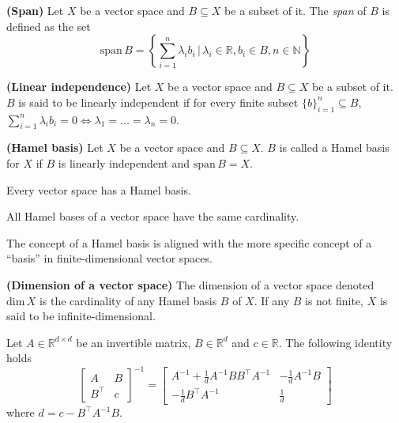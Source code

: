 \begin{definition}
	\textbf{(Span)}
	Let $X$ be a vector space and $B \subseteq X$ be a subset of it. The \textit{span} of $B$ is defined as the set
	\begin{equation}
		\text{span}\,B = \left\{ \sum_{i=1}^n \lambda_i b_i \, | \, \lambda_i \in \mathbb{R}, b_i \in B, n \in \mathbb{N} \right\} 
	\end{equation}
\end{definition}

\begin{definition}
	\textbf{(Linear independence)}
	Let $X$ be a vector space and $B \subseteq X$ be a subset of it. $B$ is said to be linearly independent if for every finite subset $\{b\}_{i=1}^n \subseteq B$, $\sum_{i=1}^n \lambda_i b_i = 0 \iff \lambda_1=\dots=\lambda_n = 0$.
\end{definition}

\begin{definition}
	\textbf{(Hamel basis)}
	Let $X$ be a vector space and $B \subseteq X$. $B$ is called a Hamel basis for $X$ if $B$ is linearly independent and $\text{span}\,B = X$.
\end{definition}

\begin{proposition}
	Every vector space has a Hamel basis.
\end{proposition}

\begin{proposition}
	All Hamel bases of a vector space have the same cardinality.
\end{proposition}

The concept of a Hamel basis is aligned with the more specific concept of a ``basis'' in finite-dimensional vector spaces. 

\begin{definition}
	\textbf{(Dimension of a vector space)}
	The dimension of a vector space denoted $\text{dim}\,X$ is the cardinality of any Hamel basis $B$ of $X$. If any $B$ is not finite, $X$ is said to be infinite-dimensional.
\end{definition}

\begin{proposition}
	Let $A \in \mathbb{R}^{d\times d}$ be an invertible matrix, $B \in \mathbb{R}^d$ and $c \in \mathbb{R}$. The following identity holds
	\begin{equation}
		\label{eq.matrix_inv_lemma}
		\begin{bmatrix}
			A & B \\
			B^\top & c
		\end{bmatrix}^{-1} 
		= 	\begin{bmatrix}
			A^{-1} + \frac{1}{d}A^{-1}BB^\top A^{-1} & - \frac{1}{d}A^{-1}B \\[3pt]
			- \frac{1}{d}B^\top A^{-1} & \frac{1}{d}
		\end{bmatrix}
	\end{equation}
	where $d = c - B^\top A^{-1} B$.
\end{proposition}

